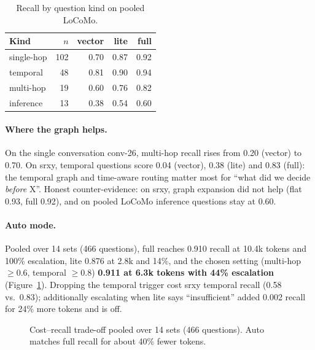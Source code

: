 \begin{table}[h]
\caption{Recall by question kind on pooled LoCoMo.}
\label{tab:kind}
\small
\begin{tabular}{@{}lrrrr@{}}
\toprule
Kind & $n$ & vector & lite & full \\
\midrule
single-hop & 102 & 0.70 & 0.87 & 0.92 \\
temporal & 48 & 0.81 & 0.90 & 0.94 \\
multi-hop & 19 & 0.60 & 0.76 & 0.82 \\
inference & 13 & 0.38 & 0.54 & 0.60 \\
\bottomrule
\end{tabular}
\end{table}

\paragraph{Where the graph helps.} On the single conversation conv-26, multi-hop recall rises from 0.20 (vector) to 0.70. On srxy, temporal questions score 0.04 (vector), 0.38 (lite) and 0.83 (full): the temporal graph and time-aware routing matter most for ``what did we decide \emph{before} X''. Honest counter-evidence: on srxy, graph expansion did not help (flat 0.93, full 0.92), and on pooled LoCoMo inference questions stay at 0.60.

\paragraph{Auto mode.} Pooled over 14 sets (466 questions), full reaches 0.910 recall at 10.4k tokens and 100\% escalation, lite 0.876 at 2.8k and 14\%, and the chosen  setting (multi-hop $\ge 0.6$, temporal $\ge 0.8$) \textbf{0.911 at 6.3k tokens with 44\% escalation} (Figure~\ref{fig:tokens}). Dropping the temporal trigger cost srxy temporal recall (0.58 vs.\ 0.83); additionally escalating when lite says ``insufficient'' added 0.002 recall for 24\% more tokens and is off.

\begin{figure}[t]
\centering
{}
\caption{Cost--recall trade-off pooled over 14 sets (466 questions). Auto matches full recall for about 40\% fewer tokens.}
\label{fig:tokens}
\end{figure}

